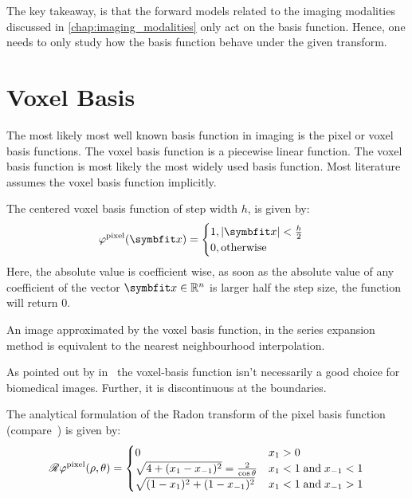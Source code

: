 The key takeaway, is that the forward models related to the imaging modalities discussed in
\autoref{chap:imaging_modalities} only act on the basis function. Hence, one needs to only study how
the basis function behave under the given transform.

\section{Voxel Basis}\label{sec:voxel_basis}

The most likely most well known basis function in imaging is the pixel or voxel basis functions. The
voxel basis function is a piecewise linear function. The voxel basis function is most likely the
most widely used basis function. Most literature assumes the voxel basis function implicitly.

The centered voxel basis function of step width \(h\), is given by:
\begin{equation}\label{eq:voxel_basis_fn}
	\varphi^{\text{pixel}}(\mvec{x}) =
	\begin{cases}
		1, \abs{\mvec{x}} < \frac{h}{2} \\
		0, \text{otherwise}
	\end{cases}
\end{equation}
Here, the absolute value is coefficient wise, as soon as the absolute value of any coefficient of
the vector \(\mvec{x} \in \mathbb{R}^n\) is larger half the step size, the function will return
\(0\).


An image approximated by the voxel basis function, in the series expansion method is equivalent to
the nearest neighbourhood interpolation.

As pointed out by \citeauthor*{lewitt_multidimensional_1990}
in~\cite{lewitt_multidimensional_1990,lewitt_alternatives_1992} the voxel-basis function isn't
necessarily a good choice for biomedical images. Further, it is discontinuous at the boundaries.

The analytical formulation of the Radon transform of the pixel basis function
(compare~\cite{toft_radon_1996}) is given by:
\begin{equation}\label{eq:radon_voxel_basis}
	\mathscr{R}\varphi^{\text{pixel}}(\rho, \theta) =
	\begin{cases}
		0                                                  & x_1 > 0                         \\
		\sqrt{4 + (x_1 - x_{-1})^2} = \frac{2}{\cos\theta} & x_1 < 1\;\text{and}\;x_{-1} < 1 \\
		\sqrt{(1 - x_1)^2 + (1 - x_{-1})^2}                & x_1 < 1\;\text{and}\;x_{-1} > 1
	\end{cases}
\end{equation}

